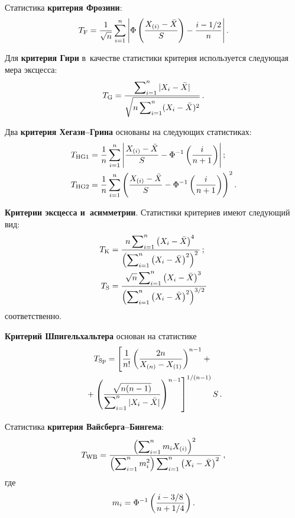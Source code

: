 \begin{multicols}{2}
Статистика \textbf{критерия Фрозини}:
$$
T_{\mathrm{F}}=\fr{1}{\sqrt n}\sum\limits_{i=1}^n
\left| \Phi\left(\fr{X_{(i)}-\bar X}{S}\right)
-\fr{i-1/2}{n} \right|.
$$

Для \textbf{критерия Гири} в~качестве статистики критерия используется сле\-ду\-ющая мера эксцесса:
$$
T_{\mathrm{G}}=\fr{\sum\nolimits_{i=1}^n|X_i-\bar X|}{\sqrt{n\sum\nolimits_{i=1}^n(X_i-\bar X)^2}}\,.
$$

Два \textbf{критерия Хе\-га\-зи--Гри\-на} основаны на сле\-ду\-ющих статистиках:
\begin{align*}
T_{\mathrm{HG1}} &=\fr{1}{n}\sum\limits_{i=1}^n\left|
\fr{X_{(i)}-\bar X}{S}-\Phi^{-1}\left(\fr{i}{n+1}\right)\right|;\\
T_{\mathrm{HG2}}&=\fr{1}{n}\sum\limits_{i=1}^n\left( \fr{X_{(i)}-\bar X}{S}-\Phi^{-1}\left(\fr{i}{n+1}\right)\right)^2.
\end{align*}

\textbf{Критерии эксцесса и~асимметрии}.
Статистики критериев имеют следующий вид:
\begin{align*}
T_{\mathrm{K}}&=\fr{n\sum\nolimits_{i=1}^n\left(X_i-\bar X\right)^4}{\left(\sum\nolimits_{i=1}^n\left(X_i-\bar X\right)^2\right)^2}\,;
\\
T_{\mathrm{S}}&=\fr{\sqrt n\sum\nolimits_{i=1}^n\left(X_i-\bar X\right)^3}{\left(\sum\nolimits_{i=1}^n\left(X_i-\bar X\right)^2\right)^{3/2}}
\end{align*}
соответственно.

\textbf{Критерий Шпигельхальтера} основан на статистике
\begin{multline*}
T_{\mathrm{Sp}}=
\left[\fr{1}{n!}\left(\fr{2n}{X_{(n)}-X_{(1)}}\right)^{n-1}+{}\right.\\
\left.{}+
\left(
\fr{\sqrt{n(n-1)}}{\sum\nolimits_{i=1}^n|X_i-\bar X|}\right)^{n-1}
\right]^{1/(n-1)}S\,.
\end{multline*}

Статистика \textbf{критерия Вайс\-бер\-га--Бин\-гема}:
$$
T_{\mathrm{WB}}=\fr{\left(\sum\nolimits_{i=1}^nm_iX_{(i)}\right)^2}{\left(\sum\nolimits_{i=1}^nm_i^2\right)\sum\nolimits_{i=1}^n\left(X_i-\bar X\right)^2}\,,
$$
где
$$
m_i=\Phi^{-1}\left(\fr{i-3/8}{n+1/4}\right).
$$


\end{multicols}
